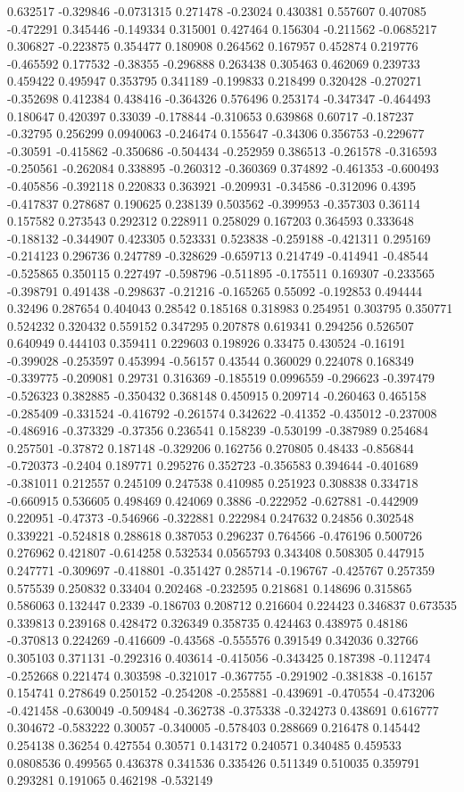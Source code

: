 0.632517 -0.329846 -0.0731315 0.271478 -0.23024 0.430381 0.557607 0.407085 -0.472291 0.345446 -0.149334 0.315001 0.427464 0.156304 -0.211562 -0.0685217 0.306827 -0.223875 0.354477 0.180908 0.264562 0.167957 0.452874 0.219776 -0.465592 0.177532 -0.38355 -0.296888 0.263438 0.305463 0.462069 0.239733 0.459422 0.495947 0.353795 0.341189 -0.199833 0.218499 0.320428 -0.270271 -0.352698 0.412384 0.438416 -0.364326 0.576496 0.253174 -0.347347 -0.464493 0.180647 0.420397 0.33039 -0.178844 -0.310653 0.639868 0.60717 -0.187237 -0.32795 0.256299 0.0940063 -0.246474 0.155647 -0.34306 0.356753 -0.229677 -0.30591 -0.415862 -0.350686 -0.504434 -0.252959 0.386513 -0.261578 -0.316593 -0.250561 -0.262084 0.338895 -0.260312 -0.360369 0.374892 -0.461353 -0.600493 -0.405856 -0.392118 0.220833 0.363921 -0.209931 -0.34586 -0.312096 0.4395 -0.417837 0.278687 0.190625 0.238139 0.503562 -0.399953 -0.357303 0.36114 0.157582 0.273543 0.292312 0.228911 0.258029 0.167203 0.364593 0.333648 -0.188132 -0.344907 0.423305 0.523331 0.523838 -0.259188 -0.421311 0.295169 -0.214123 0.296736 0.247789 -0.328629 -0.659713 0.214749 -0.414941 -0.48544 -0.525865 0.350115 0.227497 -0.598796 -0.511895 -0.175511 0.169307 -0.233565 -0.398791 0.491438 -0.298637 -0.21216 -0.165265 0.55092 -0.192853 0.494444 0.32496 0.287654 0.404043 0.28542 0.185168 0.318983 0.254951 0.303795 0.350771 0.524232 0.320432 0.559152 0.347295 0.207878 0.619341 0.294256 0.526507 0.640949 0.444103 0.359411 0.229603 0.198926 0.33475 0.430524 -0.16191 -0.399028 -0.253597 0.453994 -0.56157 0.43544 0.360029 0.224078 0.168349 -0.339775 -0.209081 0.29731 0.316369 -0.185519 0.0996559 -0.296623 -0.397479 -0.526323 0.382885 -0.350432 0.368148 0.450915 0.209714 -0.260463 0.465158 -0.285409 -0.331524 -0.416792 -0.261574 0.342622 -0.41352 -0.435012 -0.237008 -0.486916 -0.373329 -0.37356 0.236541 0.158239 -0.530199 -0.387989 0.254684 0.257501 -0.37872 0.187148 -0.329206 0.162756 0.270805 0.48433 -0.856844 -0.720373 -0.2404 0.189771 0.295276 0.352723 -0.356583 0.394644 -0.401689 -0.381011 0.212557 0.245109 0.247538 0.410985 0.251923 0.308838 0.334718 -0.660915 0.536605 0.498469 0.424069 0.3886 -0.222952 -0.627881 -0.442909 0.220951 -0.47373 -0.546966 -0.322881 0.222984 0.247632 0.24856 0.302548 0.339221 -0.524818 0.288618 0.387053 0.296237 0.764566 -0.476196 0.500726 0.276962 0.421807 -0.614258 0.532534 0.0565793 0.343408 0.508305 0.447915 0.247771 -0.309697 -0.418801 -0.351427 0.285714 -0.196767 -0.425767 0.257359 0.575539 0.250832 0.33404 0.202468 -0.232595 0.218681 0.148696 0.315865 0.586063 0.132447 0.2339 -0.186703 0.208712 0.216604 0.224423 0.346837 0.673535 0.339813 0.239168 0.428472 0.326349 0.358735 0.424463 0.438975 0.48186 -0.370813 0.224269 -0.416609 -0.43568 -0.555576 0.391549 0.342036 0.32766 0.305103 0.371131 -0.292316 0.403614 -0.415056 -0.343425 0.187398 -0.112474 -0.252668 0.221474 0.303598 -0.321017 -0.367755 -0.291902 -0.381838 -0.16157 0.154741 0.278649 0.250152 -0.254208 -0.255881 -0.439691 -0.470554 -0.473206 -0.421458 -0.630049 -0.509484 -0.362738 -0.375338 -0.324273 0.438691 0.616777 0.304672 -0.583222 0.30057 -0.340005 -0.578403 0.288669 0.216478 0.145442 0.254138 0.36254 0.427554 0.30571 0.143172 0.240571 0.340485 0.459533 0.0808536 0.499565 0.436378 0.341536 0.335426 0.511349 0.510035 0.359791 0.293281 0.191065 0.462198 -0.532149 